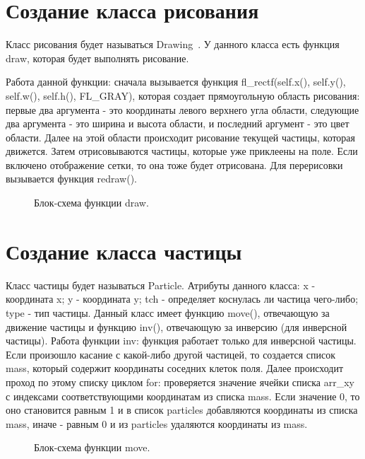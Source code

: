 \section{Создание класса рисования}
Класс рисования будет называться Drawing~\cite{expleDrw}. У данного класса есть функция draw, которая будет выполнять рисование. 

Работа данной функции: сначала вызывается функция fl\_rectf(self.x(), self.y(), self.w(), self.h(), FL\_GRAY), которая создает прямоугольную область рисования: первые два аргумента - это координаты левого верхнего угла области, следующие два аргумента - это ширина и высота области, и последний аргумент - это цвет области. Далее на этой области происходит рисование текущей частицы, которая движется. Затем отрисовываются частицы, которые уже приклеены на поле. Если включено отображение сетки, то она тоже будет отрисована. Для перерисовки вызывается функция redraw(). 

\begin{figure}[H]
    \centering
    
    \caption{Блок-схема функции draw.}
\end{figure}

\section{Создание класса частицы}
Класс частицы будет называться Particle. Атрибуты данного класса: x - координата x; y - координата y; tch - определяет коснулась ли частица чего-либо; type - тип частицы. Данный класс имеет функцию move(), отвечающую за движение частицы и функцию inv(), отвечающую за инверсию (для инверсной частицы).
Работа функции inv: функция работает только для инверсной частицы. Если произошло касание с какой-либо другой частицей, то создается список mass, который содержит координаты соседних клеток поля. Далее происходит проход по этому списку циклом for: проверяется значение ячейки списка arr\_xy с индексами соответствующими координатам из списка mass. Если значение 0, то оно становится равным 1 и в список particles добавляются координаты из списка mass, иначе - равным 0 и из particles удаляются координаты из mass.


\begin{figure}[H]
    \centering
    
    \caption{Блок-схема функции move.}
\end{figure}

